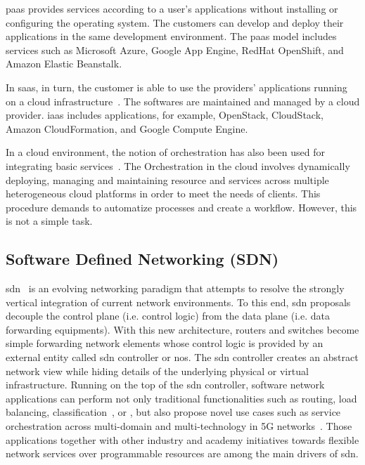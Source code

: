 \gls{paas} provides services according to a user’s applications without installing or configuring the operating system. The customers can develop and deploy their applications in the same development environment. The \gls{paas} model includes services such as Microsoft Azure, Google App Engine, RedHat OpenShift, and Amazon Elastic Beanstalk.  

In \gls{saas}, in turn, the customer is able to use the providers' applications running on a cloud infrastructure~\cite{Mijumbi2016NetworkChallenges}. The softwares are maintained and managed by a cloud provider. \gls{iaas} includes applications, for example, OpenStack, CloudStack, Amazon CloudFormation, and Google Compute Engine.

In a cloud environment, the notion of orchestration has also been used for integrating basic services~\cite{Vouk2008CloudImplementations}. The Orchestration in the cloud involves dynamically deploying, managing and maintaining resource and services across multiple heterogeneous cloud platforms in order to meet the needs of clients. This procedure demands to automatize processes and create a workflow. However, this is not a simple task.

\subsection{Software Defined Networking (SDN)}

\gls{sdn}~\cite{surveySDN} is an evolving networking paradigm that attempts to resolve the strongly vertical integration of current network environments. To this end, \gls{sdn} proposals decouple the control plane (i.e. control logic) from the data plane (i.e. data forwarding equipments). With this new architecture, routers and switches become simple forwarding network elements whose control logic is provided by an external entity called \gls{sdn} controller or \gls{nos}. The \gls{sdn} controller creates an abstract network view while hiding details of the underlying physical or virtual infrastructure. Running on the top of the \gls{sdn} controller, software network applications can perform not only traditional functionalities such as routing, load balancing, classification~\cite{6965141}, or , but also propose novel use cases such as service  orchestration across multi-domain and multi-technology in 5G networks~\cite{Bernardos20155GInfrastructures}. Those applications together with other industry and academy initiatives towards flexible network services over programmable resources are among the main drivers of \gls{sdn}.

